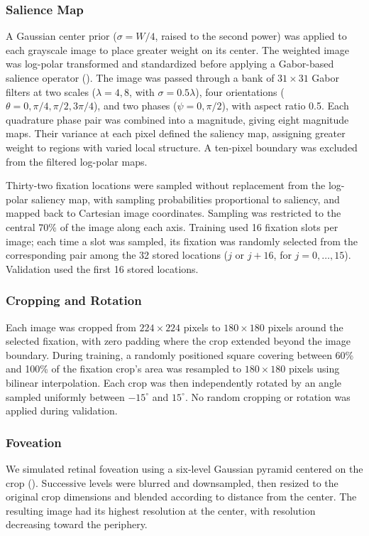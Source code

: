 \subsubsection{Salience Map}
A Gaussian center prior ($\sigma=W/4$, raised to the second power) was applied to each grayscale image to place greater weight on its center. The weighted image was log-polar transformed and standardized before applying a Gabor-based salience operator (\cite{yamada1995model}). The image was passed through a bank of $31\times31$ Gabor filters at two scales ($\lambda=4,8$, with $\sigma=0.5\lambda$), four orientations ($\theta=0,\pi/4,\pi/2,3\pi/4$), and two phases ($\psi=0,\pi/2$), with aspect ratio 0.5. Each quadrature phase pair was combined into a magnitude, giving eight magnitude maps. Their variance at each pixel defined the saliency map, assigning greater weight to regions with varied local structure. A ten-pixel boundary was excluded from the filtered log-polar maps.

Thirty-two fixation locations were sampled without replacement from the log-polar saliency map, with sampling probabilities proportional to saliency, and mapped back to Cartesian image coordinates. Sampling was restricted to the central 70\% of the image along each axis. Training used 16 fixation slots per image; each time a slot was sampled, its fixation was randomly selected from the corresponding pair among the 32 stored locations ($j$ or $j+16$, for $j=0,\ldots,15$). Validation used the first 16 stored locations.

\subsubsection{Cropping and Rotation}
Each image was cropped from $224\times224$ pixels to $180\times180$ pixels around the selected fixation, with zero padding where the crop extended beyond the image boundary. During training, a randomly positioned square covering between 60\% and 100\% of the fixation crop's area was resampled to $180\times180$ pixels using bilinear interpolation. Each crop was then independently rotated by an angle sampled uniformly between $-15^\circ$ and $15^\circ$. No random cropping or rotation was applied during validation.

\subsubsection{Foveation}
We simulated retinal foveation using a six-level Gaussian pyramid centered on the crop (\cite{Jiang2015}). Successive levels were blurred and downsampled, then resized to the original crop dimensions and blended according to distance from the center. The resulting image had its highest resolution at the center, with resolution decreasing toward the periphery.

